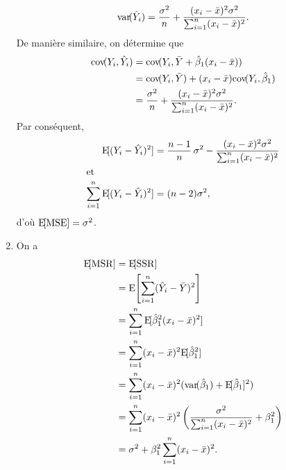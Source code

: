 \begin{solution}{2.8}
\begin{enumerate}
      \begin{displaymath}
        \mathrm{var}\! ( \hat{Y}_i ) = \frac{\sigma^2}{n} +
        \frac{(x_i - \bar{x})^2 \sigma^2}{\sum_{i=1}^n (x_i - \bar{x})^2}.
      \end{displaymath}
      De manière similaire, on détermine que
      \begin{align*}
        \mathrm{cov}\! ( Y_i, \hat{Y}_i )
        &= \mathrm{cov}\! ( Y_i, \bar{Y} + \hat{\beta}_1 (x_i - \bar{x}) ) \\
        &= \mathrm{cov}\! ( Y_i, \bar{Y} ) +
        (x_i - \bar{x}) \mathrm{cov}\! ( Y_i, \hat{\beta}_1 ) \\
        &= \frac{\sigma^2}{n} + \frac{(x_i -
          \bar{x})^2 \sigma^2}{\sum_{i=1}^n (x_i - \bar{x})^2}.
      \end{align*}
      Par conséquent,
      \begin{align*}
        \mathrm{E}\! [ (Y_i - \hat{Y}_i)^2 ]
        &= \frac{n - 1}{n}\, \sigma^2 -
        \frac{(x_i - \bar{x})^2 \sigma^2}{\sum_{i = 1}^n (x_i - \bar{x})^2} \\
        \intertext{et}
        \sum_{i=1}^n \mathrm{E}\! [ (Y_i - \hat{Y}_i)^2 ]
        & = (n - 2) \sigma^2,
      \end{align*}
      d'où $\mathrm{E}\! [ \mathrm{MSE} ] = \sigma^2$.
    \item On a
      \begin{align*}
        \mathrm{E}\! [ \mathrm{MSR} ]
        &= \mathrm{E}\! [ \mathrm{SSR} ] \\
        &= \mathrm{E}\! \left[ \sum_{i=1}^n (\hat{Y}_i - \bar{Y})^2 \right] \\
        &= \sum_{i=1}^n \mathrm{E}\! [ \hat{\beta}_1^2 (x_i - \bar{x})^2 ] \\
        &= \sum_{i=1}^n (x_i - \bar{x})^2 \mathrm{E}\! [ \hat{\beta}_1^2 ] \\
        &= \sum_{i=1}^n (x_i - \bar{x})^2 (\mathrm{var}\! ( \hat{\beta}_1 ) +
        \mathrm{E}\! [ \hat{\beta}_1 ]^2) \\
        &= \sum_{i=1}^n (x_i - \bar{x})^2
        \left(
          \frac{\sigma^2}{\sum_{i=1}^n (x_i - \bar{x})^2} + \beta_1^2
        \right) \\
        &= \sigma^2 + \beta_1^2 \sum_{i=1}^n (x_i - \bar{x})^2.
      \end{align*}
    \end{enumerate}
  
\end{solution}
